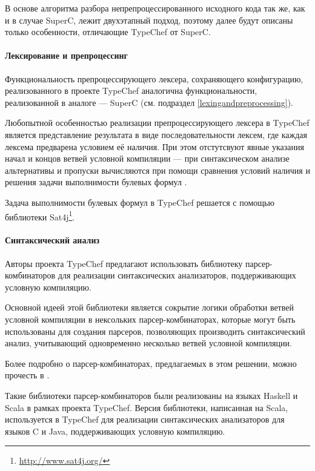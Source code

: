 В основе алгоритма разбора непрепроцессированного исходного кода так же, как и в случае SuperC, лежит двухэтапный подход, поэтому далее будут описаны только особенности, отличающие TypeChef от SuperC.

\paragraph{Лексирование и препроцессинг}

Функциональность препроцессирующего лексера, сохраняющего конфигурацию, реализованного в проекте TypeChef аналогична функциональности, реализованной в аналоге --- SuperC (см. подраздел \ref{lexingandpreprocessing}).

Любопытной особенностью реализации препроцессирующего лексера в TypeChef является представление результата в виде последовательности лексем, где каждая лексема предварена условием её наличия. При этом отстутсвуют явные указания начал и концов ветвей условной компиляции --- при синтаксическом анализе альтернативы и пропуски вычисляются при помощи сравнения условий наличия и решения задачи выполнимости булевых формул \cite{garey}.

Задача выполнимости булевых формул в TypeChef решается с помощью библиотеки Sat4j\footnote{\url{http://www.sat4j.org/}}.

\paragraph{Синтаксический анализ}

Авторы проекта TypeChef предлагают использовать библиотеку парсер-комбинаторов для реализации синтаксических анализаторов, поддерживающих условную компиляцию.

Основной идеей этой библиотеки является сокрытие логики обработки ветвей условной компиляции в нексольких парсер-комбинаторах, которые могут быть использованы для создания парсеров, позволяющих производить синтаксический анализ, учитывающий одновременно несколько ветвей условной компиляции.


Более подробно о парсер-комбинаторах, предлагаемых в этом решении, можно прочесть в \cite{typechef2}.

Такие библиотеки парсер-комбинаторов были реализованы на языках Haskell и Scala в рамках проекта TypeChef. Версия библиотеки, написанная на Scala, используется в TypeChef для реализации синтаксических анализаторов для языков C и Java, поддерживающих условную компиляцию.

